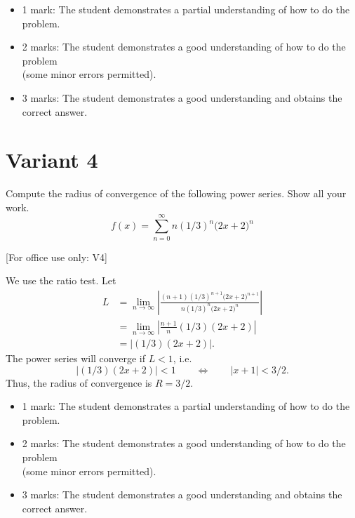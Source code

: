 \documentclass{article}
\begin{document}
            \begin{small}
            \begin{itemize}
            \item 1 mark: The student demonstrates a partial understanding of how to do the problem.
            \item 2 marks: The student demonstrates a good understanding of how to do the problem \\ (some minor errors permitted).
            \item 3 marks: The student demonstrates a good understanding and obtains the correct answer.
            \end{itemize}
            \end{small}


        \newpage
        \section{Variant 4}
        \label{v4}


Compute the radius of convergence of the following power series. Show all your work.
    \[
    f(x) = \sum_{n=0}^\infty n\left(1/3\right)^n \big(2x + 2\big)^n
    \]


[For office use only: V4]
        \medskip



    We use the ratio test. Let
      \begin{align*}
        L &= \lim_{n\to\infty} \left| 
        \frac{(n+1)\left(1/3\right)^{n+1}\big(2x + 2\big)^{n+1}}
        {n\left(1/3\right)^n \big(2x + 2\big)^n}
        \right|\\
        &= \lim_{n\to\infty} \left| \frac{n+1}{n}(1/3)(2x+2)\right| \\
        &= \left| (1/3)(2x+2)\right|.
       \end{align*}
       The power series will converge if $L < 1$, i.e.
       \[
        \left| (1/3)(2x+2)\right| < 1 \qquad\Longleftrightarrow \qquad
        \left|x + 1\right| < 3/2.
       \]
       Thus, the radius of convergence is $R = 3/2$.
        \medskip

            \begin{small}
            \begin{itemize}
            \item 1 mark: The student demonstrates a partial understanding of how to do the problem.
            \item 2 marks: The student demonstrates a good understanding of how to do the problem \\ (some minor errors permitted).
            \item 3 marks: The student demonstrates a good understanding and obtains the correct answer.
            \end{itemize}
            \end{small}
\end{document}
